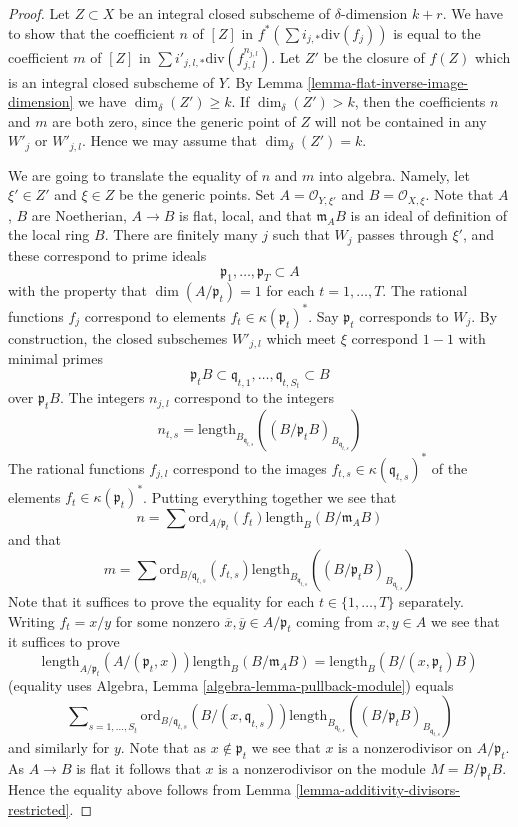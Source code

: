 \begin{proof}
\medskip\noindent
Let $Z \subset X$ be an integral closed subscheme of $\delta$-dimension
$k + r$. We have to show that the coefficient $n$ of $[Z]$ in
$f^*(\sum i_{j, *}\text{div}(f_j))$ is equal to the coefficient
$m$ of $[Z]$ in $\sum i'_{j, l, *} \text{div}(f_{j, l}^{n_{j, l}})$.
Let $Z'$ be the closure of $f(Z)$ which is an integral closed
subscheme of $Y$. By Lemma \ref{lemma-flat-inverse-image-dimension}
we have $\dim_\delta(Z') \geq k$.
If $\dim_\delta(Z') > k$, then the coefficients $n$ and $m$ are
both zero, since the generic point of $Z$ will not be contained
in any $W'_j$ or $W'_{j, l}$. Hence we may assume that $\dim_\delta(Z') = k$.

\medskip\noindent
We are going to translate the equality of $n$ and $m$ into algebra.
Namely, let $\xi' \in Z'$ and $\xi \in Z$ be the generic points.
Set $A = \mathcal{O}_{Y, \xi'}$ and $B = \mathcal{O}_{X, \xi}$.
Note that $A$, $B$ are Noetherian, $A \to B$ is flat, local,
and that $\mathfrak m_AB$ is an ideal of definition of the local ring $B$.
There are finitely many $j$ such that $W_j$ passes through
$\xi'$, and these correspond to prime ideals
$$
\mathfrak p_1, \ldots, \mathfrak p_T \subset A
$$
with the property that $\dim(A/\mathfrak p_t) = 1$ for each
$t = 1, \ldots, T$. The rational functions $f_j$ correspond
to elements $f_t \in \kappa(\mathfrak p_t)^*$.
Say $\mathfrak p_t$ corresponds to $W_j$.
By construction, the closed subschemes $W'_{j, l}$ which meet
$\xi$ correspond $1 - 1$ with minimal primes
$$
\mathfrak p_tB
\subset
\mathfrak q_{t, 1}, \ldots, \mathfrak q_{t, S_t}
\subset
B
$$
over $\mathfrak p_tB$.
The integers $n_{j, l}$ correspond to the integers
$$
n_{t, s} = \text{length}_{B_{\mathfrak q_{t, s}}}
((B/\mathfrak p_tB)_{B_{\mathfrak q_{t, s}}})
$$
The rational functions $f_{j, l}$ correspond to the images
$f_{t, s} \in \kappa(\mathfrak q_{t, s})^*$ of the elements
$f_t \in \kappa(\mathfrak p_t)^*$. Putting everything together
we see that
$$
n = \sum \text{ord}_{A/\mathfrak p_t}(f_t)\text{length}_B(B/\mathfrak m_AB)
$$
and that
$$
m = \sum \text{ord}_{B/\mathfrak q_{t, s}}(f_{t, s})
\text{length}_{B_{\mathfrak q_{t, s}}}
((B/\mathfrak p_tB)_{B_{\mathfrak q_{t, s}}})
$$
Note that it suffices to prove the equality for each
$t \in \{1, \ldots, T\}$ separately. Writing $f_t = x/y$
for some nonzero $\overline{x}, \overline{y} \in A/\mathfrak p_t$
coming from $x, y\in A$ we see that it suffices
to prove
$$
\text{length}_{A/\mathfrak p_t}(A/(\mathfrak p_t, x))
\text{length}_B(B/\mathfrak m_AB)
=
\text{length}_B(B/(x, \mathfrak p_t)B)
$$
(equality uses Algebra, Lemma \ref{algebra-lemma-pullback-module})
equals
$$
\sum\nolimits_{s = 1, \ldots, S_t}
\text{ord}_{B/\mathfrak q_{t, s}}(B/(x, \mathfrak q_{t, s}))
\text{length}_{B_{\mathfrak q_{t, s}}}
((B/\mathfrak p_tB)_{B_{\mathfrak q_{t, s}}})
$$
and similarly for $y$. Note that as $x \not \in \mathfrak p_t$ we
see that $x$ is a nonzerodivisor on $A/\mathfrak p_t$. As $A \to B$
is flat it follows that $x$ is a nonzerodivisor on the module
$M = B/\mathfrak p_tB$. Hence the equality above follows from
Lemma \ref{lemma-additivity-divisors-restricted}.
\end{proof}

